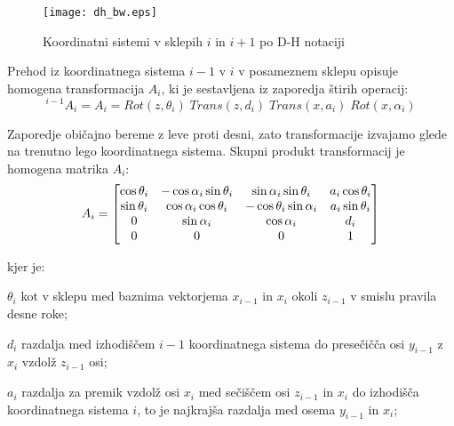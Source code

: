 \begin{figure}[h]
\centering
\texttt{[image: dh\_bw.eps]}
  \caption{\label{fig} Koordinatni sistemi v sklepih $i$ in $i+1$ po D-H notaciji}
\end{figure}

\begin{mdframed}[backgroundcolor=green!20, shadow=false,roundcorner=12pt,topline
=false, rightline=false,bottomline=false,leftline=false]

Prehod iz koordinatnega sistema $i-1$ v $i$ v posameznem sklepu opisuje
homogena transformacija $A_i$, ki je sestavljena iz zaporedja štirih operacij:
\begin{equation}\label{}
^{i-1}A_i = A_i = Rot(z,\theta_i)\;Trans(z,d_i)\;Trans(x,a_i)\;Rot(x,\alpha_i)
 \end{equation}

Zaporedje običajno bereme z leve proti desni, zato transformacije
izvajamo glede na trenutno lego koordinatnega sistema. Skupni
produkt transformacij je homogena matrika $A_i$:
\begin{equation}
A_i = \left[\begin{matrix} \cos \theta_i & -\cos \alpha_i \sin
\theta_i & \sin \alpha_i \sin \theta_i & a_i \cos \theta_i \cr \sin
\theta_i & \cos \alpha_i \cos \theta_i & -\cos \theta_i \sin \alpha_i
& a_i \sin \theta_i  \cr 0 & \sin \alpha_i & \cos \alpha_i & d_i \cr
0 & 0& 0 & 1 \end{matrix} \right]
\end{equation}

kjer je:

\begin{description}
\item \vspace*{-0.1cm} $\theta_i$ kot v sklepu med baznima vektorjema
$x_{i-1}$ in $x_{i}$ okoli $z_{i-1}$  v smislu pravila desne roke;

\item \vspace*{-0.1cm} $d_i$ razdalja med izhodiščem $i-1$
koordinatnega sistema do presečičča osi $y_{i-1}$ z $x_{i}$ vzdolž
$z_{i-1}$ osi;

\item \vspace*{-0.1cm} $a_i$ razdalja za premik vzdolž osi $x_{i}$
med sečiščem osi $z_{i-1}$ in $x_{i}$ do izhodišča koordinatnega
sistema $i$, to je najkrajša razdalja med osema $y_{i-1}$ in $x_{i}$;


\end{description}
\end{mdframed}
